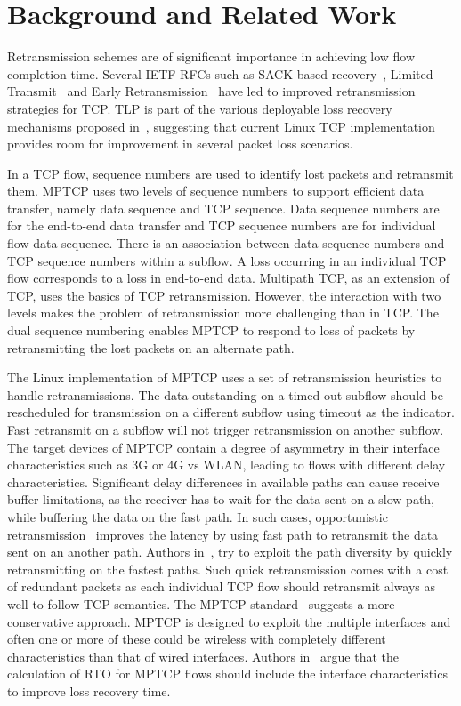 \documentclass[10pt,conference,compsoc]{IEEEtran}
\begin{document}
\section{Background and Related Work}\label{relwork}

Retransmission schemes are of significant importance in achieving low flow completion time. Several IETF RFCs such as SACK based recovery~\cite{rfc6675}, Limited Transmit~\cite{rfc3042} and Early Retransmission~\cite{rfc5827} have led to improved retransmission strategies for TCP. TLP is part of the various deployable loss recovery mechanisms proposed in~\cite{Flach:2013}, suggesting that current Linux TCP implementation provides room for improvement in several packet loss scenarios. 

In a TCP flow, sequence numbers are used to identify lost packets and retransmit them. MPTCP uses two levels of sequence numbers to support efficient data transfer, namely data sequence and TCP sequence. Data sequence numbers are for the end-to-end data transfer and TCP sequence numbers are for individual flow data sequence. There is an association between data sequence numbers and TCP sequence numbers within a subflow.  A loss occurring in an individual TCP flow corresponds to a loss in end-to-end data. Multipath TCP, as an extension of TCP, uses the basics of TCP retransmission. However, the interaction with two levels makes the problem of retransmission more challenging than in TCP. The dual sequence numbering enables MPTCP to respond to loss of packets by retransmitting the lost packets on an alternate path.  

The Linux implementation of MPTCP uses a set of retransmission heuristics to handle retransmissions. The data outstanding on a timed out subflow should be rescheduled for transmission on a different subflow using timeout as the indicator. Fast retransmit on a subflow will not trigger retransmission on another subflow. The target devices of MPTCP contain a degree of asymmetry in their interface characteristics such as 3G or 4G vs WLAN, leading to flows with different delay characteristics. Significant delay differences in available paths can cause receive buffer limitations, as the receiver has to wait for the data sent on a slow path, while buffering the data on the fast path. In such cases, opportunistic retransmission~\cite{Costin} improves the latency by using fast path to retransmit the data sent on an another path. Authors in~\cite{fuso}, try to exploit the path diversity by quickly retransmitting on the fastest paths. Such quick retransmission comes with a cost of redundant packets as each individual TCP flow should retransmit always as well to follow TCP semantics. The MPTCP standard~\cite{rfc6824} suggests a more conservative approach. MPTCP is designed to exploit the multiple interfaces and often one or more of these could be wireless with completely different characteristics than that of wired interfaces. Authors in~\cite{Shin} argue that the calculation of RTO for MPTCP flows should include the interface characteristics to improve loss recovery time. 
\end{document}
